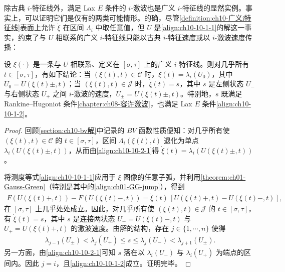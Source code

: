 \documentclass[../../main.tex]{subfiles}
\begin{document}
除古典 $i$-特征线外，满足 Lax $E$ 条件的 $i$-激波也是广义 $i$-特征线的显然实例。事实上，可以证明它们是仅有的两类可能情形。的确，尽管\cref{definition:ch10-广义i特征线}表面上允许 $\dot{\xi}$ 在区间 $\Lambda_{i}$ 中取任意值，但 $U$ 是\eqref{align:ch10-10-1-1}的解这一事实，约束了与 $U$ 相联系的广义 $i$-特征线只能以古典 $i$-特征速度或以 $i$-激波速度传播：

\begin{theorem}\label{theorem:ch10-广义特征线速度约束}
设 $\xi(\cdot)$ 是一条与 $U$ 相联系、定义在 $[\sigma,\tau]$ 上的广义 $i$-特征线。则对几乎所有 $t\in[\sigma,\tau]$，有如下结论：当 $(\xi(t),t)\in\mathscr{C}$ 时，$\dot{\xi}(t)=\lambda_{i}(U_{0})$，其中 $U_{0}=U(\xi(t)\pm,t)$；当 $(\xi(t),t)\in\mathscr{J}$ 时，$\dot{\xi}(t)=s$，其中 $s$ 是左侧状态 $U_{-}$ 与右侧状态 $U_{+}$ 之间 $i$-激波的速度，$U_{\pm}=U(\xi(t)\pm,t)$。特别地，$s$ 既满足 Rankine--Hugoniot 条件\cref{chapter:ch08-容许激波}，也满足 Lax $E$ 条件\eqref{align:ch10-10-1-2}。

\end{theorem}

\begin{proof}
回顾\cref{section:ch10-bv解}中记录的 $BV$ 函数性质便知：对几乎所有使 $(\xi(t),t)\in\mathscr{C}$ 的 $t\in[\sigma,\tau]$，区间 $\Lambda_{i}(\xi(t),t)$ 退化为单点 $\lambda_{i}(U(\xi(t)\pm,t))$，从而由\eqref{align:ch10-10-2-1}得 $\dot{\xi}(t)=\lambda_{i}(U(\xi(t)\pm,t))$。

将测度等式\eqref{align:ch10-10-1-1}应用于 $\xi$ 图像的任意子弧，并利用\cref{theorem:ch01-Gauss-Green}（特别是其中的\eqref{align:ch01-GG-jump}），得到
\begin{align}
F(U(\xi(t)+,t))-F(U(\xi(t)-,t))=\dot{\xi}(t)\,[U(\xi(t)+,t)-U(\xi(t)-,t)],
\label{align:ch10-10-2-3}
\end{align}
在 $[\sigma,\tau]$ 上几乎处处成立。因此，对几乎所有使 $(\xi(t),t)\in\mathscr{J}$ 的 $t\in[\sigma,\tau]$，有 $\dot{\xi}(t)=s$，其中 $s$ 是连接两状态 $U_{-}=U(\xi(t)-,t)$ 与 $U_{+}=U(\xi(t)+,t)$ 的激波速度。由解的结构，存在 $j\in\{1,\cdots,n\}$ 使得
\begin{align*}
\lambda_{j-1}(U_{\pm})<\lambda_{j}(U_{+})\leqslant s\leqslant\lambda_{j}(U_{-})<\lambda_{j+1}(U_{\pm}).
\end{align*}
另一方面，由\eqref{align:ch10-10-2-1}可知 $s$ 落在以 $\lambda_{i}(U_{-})$ 与 $\lambda_{i}(U_{+})$ 为端点的区间内。因此 $j=i$，且\eqref{align:ch10-10-1-2}成立。证明完毕。

\end{proof}
\end{document}
